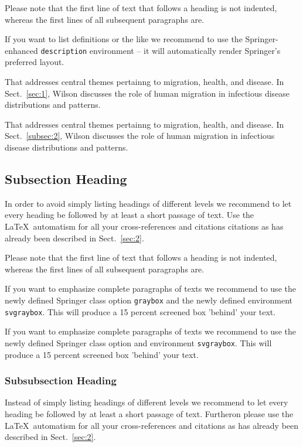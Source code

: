 Please note that the first line of text that follows a heading is not indented, whereas the first lines of all subsequent paragraphs are.

If you want to list definitions or the like we recommend to use the Springer-enhanced \verb|description| environment -- it will automatically render Springer's preferred layout.

\begin{description}[Type 1]
\item[Type 1]{That addresses central themes pertainng to migration, health, and disease. In Sect.~\ref{sec:1}, Wilson discusses the role of human migration in infectious disease distributions and patterns.}
\item[Type 2]{That addresses central themes pertainng to migration, health, and disease. In Sect.~\ref{subsec:2}, Wilson discusses the role of human migration in infectious disease distributions and patterns.}
\end{description}

\subsection{Subsection Heading} %
In order to avoid simply listing headings of different levels we recommend to let every heading be followed by at least a short passage of text. Use the \LaTeX\ automatism for all your cross-references and citations citations as has already been described in Sect.~\ref{sec:2}.

Please note that the first line of text that follows a heading is not indented, whereas the first lines of all subsequent paragraphs are.

\begin{svgraybox}
If you want to emphasize complete paragraphs of texts we recommend to use the newly defined Springer class option \verb|graybox| and the newly defined environment \verb|svgraybox|. This will produce a 15 percent screened box 'behind' your text.

If you want to emphasize complete paragraphs of texts we recommend to use the newly defined Springer class option and environment \verb|svgraybox|. This will produce a 15 percent screened box 'behind' your text.
\end{svgraybox}


\subsubsection{Subsubsection Heading}
Instead of simply listing headings of different levels we recommend to let every heading be followed by at least a short passage of text. Furtheron please use the \LaTeX\ automatism for all your cross-references and citations as has already been described in Sect.~\ref{sec:2}.

